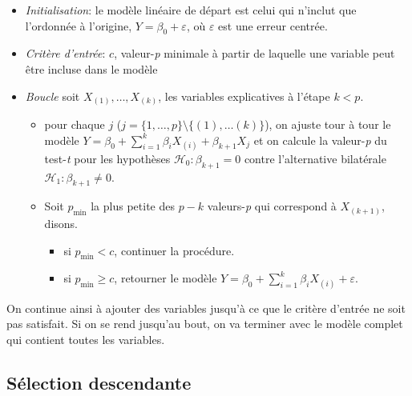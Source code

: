 \documentclass[
  11pt,
  letterpaper,
]{book}
\providecommand{\tightlist}{%
  \setlength{\itemsep}{0pt}\setlength{\parskip}{0pt}}
\theoremstyle{definition}
\theoremstyle{definition}
\theoremstyle{definition}
\theoremstyle{definition}
\theoremstyle{remark}
\begin{document}
\begin{itemize}
\tightlist
\item
  \emph{Initialisation}: le modèle linéaire de départ est celui qui n'inclut que l'ordonnée à l'origine, \(Y=\beta_0+\varepsilon\), où \(\varepsilon\) est une erreur centrée.
\item
  \emph{Critère d'entrée}: \(c\), valeur-\emph{p} minimale à partir de laquelle une variable peut être incluse dans le modèle
\item
  \emph{Boucle} soit \(X_{(1)}, \ldots, X_{(k)}\), les variables explicatives à l'étape \(k<p\).

  \begin{itemize}
  \tightlist
  \item
    pour chaque \(j\) (\(j=\{1,\ldots, p\}\setminus \{(1), \ldots (k)\}\)), on ajuste tour à tour le modèle \(Y=\beta_0+\sum_{i=1}^k \beta_i X_{(i)} + \beta_{k+1}X_{j}\) et on calcule la valeur-\emph{p} du test-\emph{t} pour les hypothèses \(\mathcal{H}_0: \beta_{k+1}=0\) contre l'alternative bilatérale \(\mathcal{H}_1: \beta_{k+1} \neq 0\).
  \item
    Soit \(p_{\min}\) la plus petite des \(p-k\) valeurs-\emph{p} qui correspond à \(X_{(k+1)}\), disons.

    \begin{itemize}
    \tightlist
    \item
      si \(p_{\min}<c\), continuer la procédure.
    \item
      si \(p_{\min} \geq c\), retourner le modèle \(Y=\beta_0 + \sum_{i=1}^k \beta_iX_{(i)}+\varepsilon\).
    \end{itemize}
  \end{itemize}
\end{itemize}

On continue ainsi à ajouter des variables jusqu'à ce que le critère d'entrée ne soit pas satisfait. Si on se rend jusqu'au bout, on va terminer avec le modèle complet qui contient toutes les variables.

\hypertarget{suxe9lection-descendante}{%
\subsection{Sélection descendante}\label{suxe9lection-descendante}}
\end{document}
